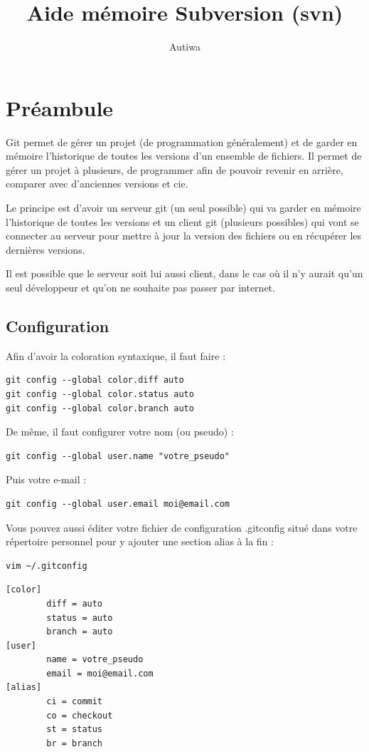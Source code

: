 \documentclass[a4paper,twoside]{article}
\title{Aide mémoire Subversion (svn)}
\author{Autiwa}
\begin{document}
\tableofcontents

\clearpage

\section{Préambule}
Git permet de gérer un projet (de programmation généralement) et de garder en mémoire l'historique de toutes les versions d'un ensemble de fichiers. Il permet de gérer un projet à plusieurs, de programmer afin de pouvoir revenir en arrière, comparer avec d'anciennes versions et cie. 

Le principe est d'avoir un serveur git (un seul possible) qui va garder en mémoire l'historique de toutes les versions et un client git (plusieurs possibles) qui vont se connecter au serveur pour mettre à jour la version des fichiers ou en récupérer les dernières versions.

\begin{remarque}
Il est possible que le serveur soit lui aussi client, dans le cas où il n'y aurait qu'un seul développeur et qu'on ne souhaite pas passer par internet.
\end{remarque}

\subsection{Configuration}
Afin d'avoir la coloration syntaxique, il faut faire : 
\begin{verbatim}
git config --global color.diff auto
git config --global color.status auto
git config --global color.branch auto
\end{verbatim}

De même, il faut configurer votre nom (ou pseudo) :
\begin{verbatim}
git config --global user.name "votre_pseudo"
\end{verbatim}


Puis votre e-mail :
\begin{verbatim}
git config --global user.email moi@email.com
\end{verbatim}


Vous pouvez aussi éditer votre fichier de configuration .gitconfig situé dans votre répertoire personnel pour y ajouter une section alias à la fin :
\begin{verbatim}
vim ~/.gitconfig
\end{verbatim}

\begin{verbatim}
[color]
        diff = auto
        status = auto
        branch = auto
[user]
        name = votre_pseudo
        email = moi@email.com
[alias]
        ci = commit
        co = checkout
        st = status
        br = branch
\end{verbatim}
\end{document}

